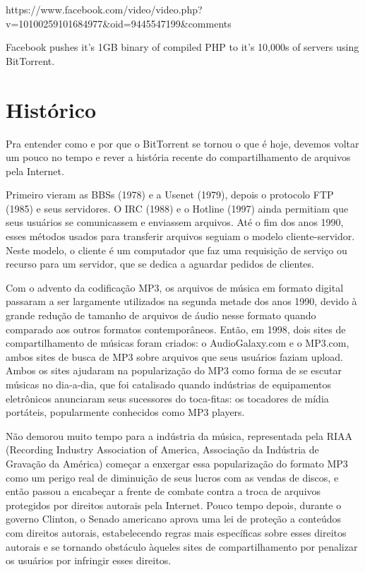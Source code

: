 https://www.facebook.com/video/video.php?v=10100259101684977&oid=9445547199&comments

Facebook pushes it’s 1GB binary of compiled PHP to it’s 10,000s of servers using BitTorrent.

\chapter{Histórico}

Pra entender como e por que o BitTorrent se tornou o que é hoje, devemos voltar um pouco no tempo e rever a história recente do compartilhamento de arquivos pela Internet. 

Primeiro vieram as BBSs (1978) e a Usenet (1979), depois o protocolo FTP (1985) e seus servidores. O IRC (1988) e o Hotline (1997) ainda permitiam que seus usuários se comunicassem e enviassem arquivos. Até o fim dos anos 1990, esses métodos usados para transferir arquivos seguiam o modelo cliente-servidor. Neste modelo, o cliente é um computador que faz uma requisição de serviço ou recurso para um servidor, que se dedica a aguardar pedidos de clientes. 

Com o advento da codificação MP3, os arquivos de música em formato digital passaram a ser largamente utilizados na segunda metade dos anos 1990, devido à grande redução de tamanho de arquivos de áudio nesse formato quando comparado aos outros formatos contemporâneos. Então, em 1998, dois sites de compartilhamento de músicas foram criados: o AudioGalaxy.com e o MP3.com, ambos sites de busca de MP3 sobre arquivos que seus usuários faziam upload. Ambos os sites ajudaram na popularização do MP3 como forma de se escutar músicas no dia-a-dia, que foi catalisado quando indústrias de equipamentos eletrônicos anunciaram seus sucessores do toca-fitas: os tocadores de mídia portáteis, popularmente conhecidos como MP3 players.

Não demorou muito tempo para a indústria da música, representada pela RIAA (Recording Industry Association of America, Associação da Indústria de Gravação da América) começar a enxergar essa popularização do formato MP3 como um perigo real de diminuição de seus lucros com as vendas de discos, e então passou a encabeçar a frente de combate contra a troca de arquivos protegidos por direitos autorais pela Internet. Pouco tempo depois, durante o governo Clinton, o Senado americano aprova uma lei de proteção a conteúdos com direitos autorais, estabelecendo regras mais específicas sobre esses direitos autorais e se tornando obstáculo àqueles sites de compartilhamento por penalizar os usuários por infringir esses direitos. 

